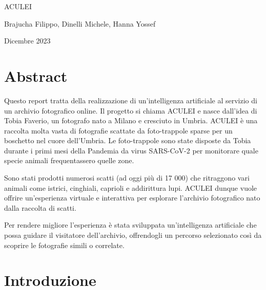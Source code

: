 \documentclass[12pt,a4paper,twoside]{article}
\begin{document}
\begin{titlepage}
    \centering
    \vspace*{\fill}

    \vspace*{0.5cm}
    
    \huge ACULEI
    
    \vspace*{1cm}
    \small Brajucha Filippo, Dinelli Michele, Hanna Yossef
    
    \vspace*{0.5cm}
    \small Dicembre 2023
    
    \vspace*{\fill}
\end{titlepage}


\newpage

\section*{Abstract}

Questo report tratta della realizzazione di un'intelligenza artificiale al servizio di un archivio fotografico 
online. Il progetto si chiama ACULEI e nasce dall'idea di Tobia Faverio, un fotografo nato a Milano e cresciuto 
in Umbria. ACULEI è una raccolta molta vasta di fotografie scattate da foto-trappole sparse per un boschetto nel 
cuore dell'Umbria. Le foto-trappole sono state disposte da Tobia durante i primi mesi della Pandemia da virus 
SARS-CoV-2 per monitorare quale specie animali frequentassero quelle zone. 

Sono stati prodotti numerosi scatti (ad oggi più di 17 000) che ritraggono vari animali come istrici, cinghiali, 
caprioli e addirittura lupi. ACULEI dunque vuole offrire un'esperienza virtuale e interattiva per esplorare 
l'archivio fotografico nato dalla raccolta di scatti. 

Per rendere migliore l'esperienza è stata sviluppata un'intelligenza artificiale che possa guidare il visitatore 
dell'archivio, offrendogli un percorso selezionato così da scoprire le fotografie simili o correlate.
 
\newpage

\tableofcontents

\newpage
\section{Introduzione}
\end{document}

